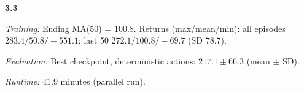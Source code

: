 \noindent\textbf{3.3}\par
\emph{Training:} Ending MA(50) = $100.8$. Returns (max/mean/min): all episodes $283.4/50.8/-551.1$; last 50 $272.1/100.8/-69.7$ (SD $78.7$).\par
\emph{Evaluation:} Best checkpoint, deterministic actions: $217.1\pm 66.3$ (mean $\pm$ SD).\par
\emph{Runtime:} $41.9$ minutes (parallel run).\par
